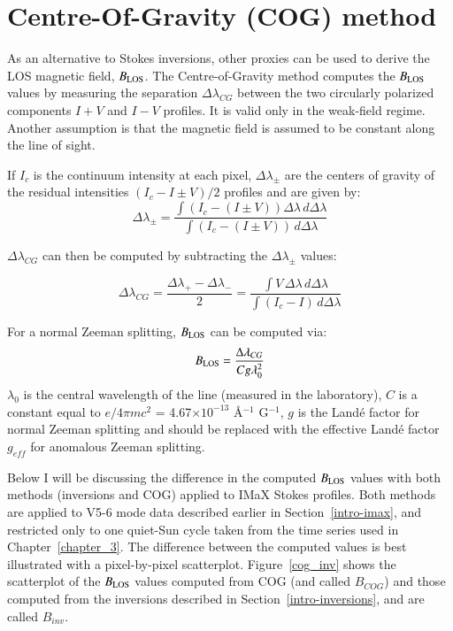 \documentclass[goettingen, gauss, print]{thesis}
\begin{document}
\section{Centre-Of-Gravity (COG) method} 
\label{intro-COG}

As an alternative to Stokes inversions, other proxies can be used to derive the LOS magnetic field, $B_{\rm LOS}$. The Centre-of-Gravity method \citep{semel_contribution_1967,rees_line_1979} computes the $B_{\rm LOS}$ values by measuring the separation $\Delta\lambda_{CG}$ between the two circularly polarized components $I+V$ and $I-V$ profiles. It is valid only in the weak-field regime. Another assumption is that the magnetic field is assumed to be constant along the line of sight.%

If $I_c$ is the continuum intensity at each pixel, $\Delta \lambda_{\pm}$ are the centers of gravity of the residual intensities $(I_c-I\pm V)/2$ profiles and are given by:
\begin{equation}
\Delta \lambda_{\pm} = \frac{\int (I_c - (I \pm V))\Delta \lambda \,d\Delta \lambda}{\int(I_c - (I \pm V)) \,d\Delta \lambda}
\end{equation}


$\Delta\lambda_{CG}$ can then be computed by subtracting the $\Delta \lambda_{\pm}$  values:

\begin{equation}
\Delta \lambda_{CG} = \frac{\Delta \lambda_{+} - \Delta \lambda_{-}}{2} =  \frac{\int V\, \Delta \lambda\, d \Delta \lambda}{\int (I_c-I) \,d\Delta \lambda}
\end{equation}

For a normal Zeeman splitting, $B_{\rm LOS}$ can be computed via: 
\begin{equation}
B_{\rm LOS} = \frac{\Delta \lambda_{CG}}{Cg\lambda_0^2}
\end{equation} $\lambda_0$ is the central wavelength of the line (measured in the laboratory), $C$ is a constant equal to $e/4\pi mc^2$ = 4.67$\times10^{-13}$ \AA{}$^{-1}$ G$^{-1}$, $g$ is the Land\'{e} factor for normal Zeeman splitting and should be replaced with the effective Land\'{e} factor $g_{eff}$ for anomalous Zeeman splitting.

Below I will be discussing the difference in the computed $B_{\rm LOS}$ values with both methods (inversions and COG) applied to IMaX Stokes profiles. Both methods are applied to V5-6 mode data described earlier in Section~\ref{intro-imax}, and restricted only to one quiet-Sun cycle taken from the time series used in Chapter~\ref{chapter_3}.
The difference between the computed values is best illustrated with a pixel-by-pixel scatterplot. Figure~\ref{cog_inv} shows the scatterplot of the $B_{\rm LOS}$ values computed from COG (and called $B_{COG}$) and those computed from the inversions described in Section~\ref{intro-inversions}, and are called $B_{inv}$. 
\end{document}
